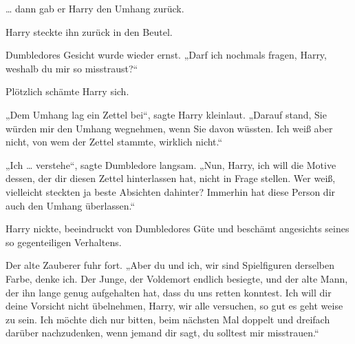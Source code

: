 … dann gab er Harry den Umhang zurück.

Harry steckte ihn zurück in den Beutel.

Dumbledores Gesicht wurde wieder ernst.
„Darf ich nochmals fragen, Harry, weshalb du mir so misstraust?“

Plötzlich schämte Harry sich.

„Dem Umhang lag ein Zettel bei“, sagte Harry kleinlaut.
„Darauf stand, Sie würden mir den Umhang wegnehmen, wenn Sie davon wüssten. Ich weiß aber nicht, von wem der Zettel stammte, wirklich nicht.“

„Ich … verstehe“, sagte Dumbledore langsam.
„Nun, Harry, ich will die Motive dessen, der dir diesen Zettel hinterlassen hat, nicht in Frage stellen. Wer weiß, vielleicht steckten ja beste Absichten dahinter? Immerhin hat diese Person dir auch den Umhang überlassen.“

Harry nickte, beeindruckt von Dumbledores Güte und beschämt angesichts seines so gegenteiligen Verhaltens.

Der alte Zauberer fuhr fort.
„Aber du und ich, wir sind Spielfiguren derselben Farbe, denke ich. Der Junge, der Voldemort endlich besiegte, und der alte Mann, der ihn lange genug aufgehalten hat, dass du uns retten konntest. Ich will dir deine Vorsicht nicht übelnehmen, Harry, wir alle versuchen, so gut es geht weise zu sein. Ich möchte dich nur bitten, beim nächsten Mal doppelt und dreifach darüber nachzudenken, wenn jemand dir sagt, du solltest mir misstrauen.“

